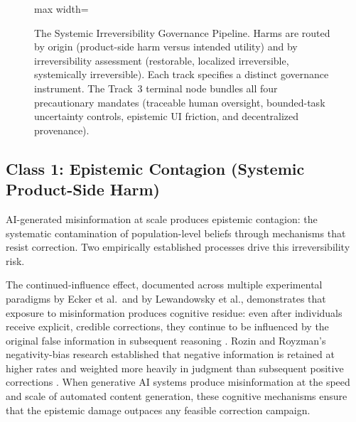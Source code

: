\documentclass[11pt]{article}
\begin{document}
\begin{figure}[H]
\begin{adjustbox}{max width=\columnwidth}
  \end{adjustbox}
  \caption{The Systemic Irreversibility Governance Pipeline. Harms are routed by origin (product-side harm versus intended utility) and by irreversibility assessment (restorable, localized irreversible, systemically irreversible). Each track specifies a distinct governance instrument. The Track~3 terminal node bundles all four precautionary mandates (traceable human oversight, bounded-task uncertainty controls, epistemic UI friction, and decentralized provenance).}
  \label{fig:architecture}
\end{figure}

\subsection{Class 1: Epistemic Contagion (Systemic Product-Side Harm)}

AI-generated misinformation at scale produces epistemic contagion: the systematic contamination of population-level beliefs through mechanisms that resist correction. Two empirically established processes drive this irreversibility risk.

The continued-influence effect, documented across multiple experimental paradigms by Ecker et al.\ and by Lewandowsky et al., demonstrates that exposure to misinformation produces cognitive residue: even after individuals receive explicit, credible corrections, they continue to be influenced by the original false information in subsequent reasoning \parencite{ecker2022,lewandowsky2012}. Rozin and Royzman's negativity-bias research established that negative information is retained at higher rates and weighted more heavily in judgment than subsequent positive corrections \parencite{rozin2001}. When generative AI systems produce misinformation at the speed and scale of automated content generation, these cognitive mechanisms ensure that the epistemic damage outpaces any feasible correction campaign.
\end{document}
